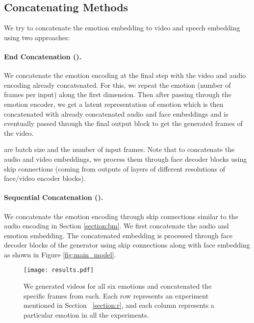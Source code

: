\documentclass[accepted]{uai2023}
\begin{document}
\subsection{Concatenating Methods}
\label{section:cm}
We try to concatenate the emotion embedding to video and speech embedding using two approaches:
\paragraph{End Concatenation ().}
    We concatenate the emotion encoding at the final step with the video and audio encoding already concatenated. For this, we repeat the emotion  (number of frames per input) along the first dimension. Then after passing through the emotion encoder, we get a latent representation of emotion which is then concatenated with already concatenated audio and face embeddings and is eventually passed through the final output block to get the generated frames of the video. 
        
        
         are batch size and the number of input frames.
    Note that to concatenate the audio and video embeddings, we process them through face decoder blocks using skip connections (coming from outputs of layers of different resolutions of face/video encoder blocks).

 \paragraph{Sequential Concatenation ().}
    We concatenate the emotion encoding through skip connections similar to the audio encoding in Section \ref{section:bm}. We first concatenate the audio and emotion embedding. The concatenated embedding is processed through face decoder blocks of the generator using skip connections along with face embedding as shown in Figure \ref{fig:main_model}.



\begin{figure}[t]
\texttt{[image: results.pdf]}
    \caption{We generated videos for all six emotions and concatenated the specific frames from each. Each row represents an experiment mentioned in Section ~\ref{section:r}, and each column represents a particular emotion in all the experiments.}
    \label{fig:results}
\end{figure}
\end{document}

